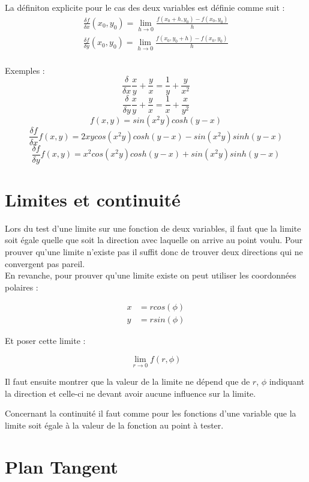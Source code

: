 \documentclass[12pt,a4paper]{report}
\begin{document}
La définiton explicite pour le cas des deux variables est définie comme suit :
\begin{align*}
\frac{\delta f}{\delta x}(x_0,y_0) = \lim\limits_{h\rightarrow 0} \frac{f(x_0+h,y_0)-f(x_0,y_0)}{h}\\
\frac{\delta f}{\delta y}(x_0,y_0) = \lim\limits_{h\rightarrow 0} \frac{f(x_0,y_0+h)-f(x_0,y_0)}{h}\\
\end{align*}

Exemples :
	$$\frac{\delta}{\delta x} \frac{x}{y} + \frac{y}{x} = \frac{1}{y} + \frac{y}{x^2}$$
	$$\frac{\delta}{\delta y} \frac{x}{y} + \frac{y}{x} = \frac{1}{x} + \frac{x}{y^2}$$
	$$f(x,y) = sin(x^2y)cosh(y-x)$$
	$$\frac{\delta f}{\delta x}f(x,y) = 2xycos(x^2y)cosh(y-x) - sin(x^2y)sinh(y-x)$$
	$$\frac{\delta f}{\delta y}f(x,y) = x^2cos(x^2y)cosh(y-x) + sin(x^2y)sinh(y-x)$$

\section{Limites et continuité}

Lors du test d'une limite sur une fonction de deux variables, il faut que la limite soit égale quelle que soit la direction avec laquelle on arrive au point voulu. Pour prouver qu'une limite n'existe pas il suffit donc de trouver deux directions qui ne convergent pas pareil. \\

En revanche, pour prouver qu'une limite existe on peut utiliser les coordonnées polaires :

\begin{align*}
x &= rcos(\phi) \\
y &= rsin(\phi)
\end{align*}

Et poser cette limite :

$$\lim_{r \to 0} f(r,\phi)$$

Il faut ensuite montrer que la valeur de la limite ne dépend que de $r$, $\phi$ indiquant la direction et celle-ci ne devant avoir aucune influence sur la limite.

Concernant la continuité il faut comme pour les fonctions d'une variable que la limite soit égale à la valeur de la fonction au point à tester.

\section{Plan Tangent}
\end{document}
